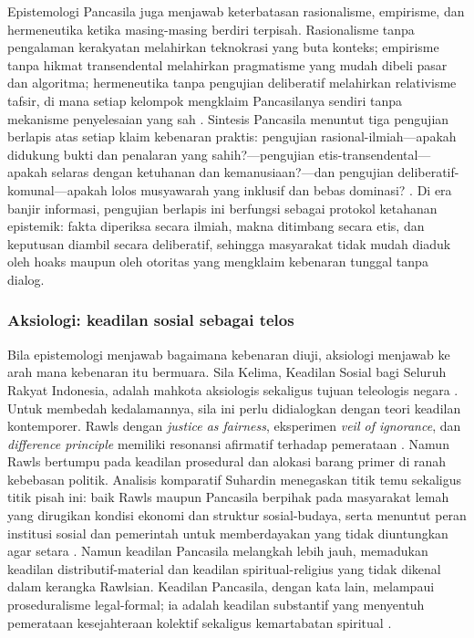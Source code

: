 \documentclass[journal]{IEEEtran}
\begin{document}
Epistemologi Pancasila juga menjawab keterbatasan rasionalisme, empirisme, dan hermeneutika ketika masing-masing berdiri terpisah. Rasionalisme tanpa pengalaman kerakyatan melahirkan teknokrasi yang buta konteks; empirisme tanpa hikmat transendental melahirkan pragmatisme yang mudah dibeli pasar dan algoritma; hermeneutika tanpa pengujian deliberatif melahirkan relativisme tafsir, di mana setiap kelompok mengklaim Pancasilanya sendiri tanpa mekanisme penyelesaian yang sah \cite{gadamer2004,ricoeur1981,pristiwiyanto2021}. Sintesis Pancasila menuntut tiga pengujian berlapis atas setiap klaim kebenaran praktis: pengujian rasional-ilmiah---apakah didukung bukti dan penalaran yang sahih?---pengujian etis-transendental---apakah selaras dengan ketuhanan dan kemanusiaan?---dan pengujian deliberatif-komunal---apakah lolos musyawarah yang inklusif dan bebas dominasi? \cite{madung2016,habermas1996}. Di era banjir informasi, pengujian berlapis ini berfungsi sebagai protokol ketahanan epistemik: fakta diperiksa secara ilmiah, makna ditimbang secara etis, dan keputusan diambil secara deliberatif, sehingga masyarakat tidak mudah diaduk oleh hoaks maupun oleh otoritas yang mengklaim kebenaran tunggal tanpa dialog.

\subsubsection{Aksiologi: keadilan sosial sebagai telos}

Bila epistemologi menjawab bagaimana kebenaran diuji, aksiologi menjawab ke arah mana kebenaran itu bermuara. Sila Kelima, Keadilan Sosial bagi Seluruh Rakyat Indonesia, adalah mahkota aksiologis sekaligus tujuan teleologis negara \cite{latif2018,pristiwiyanto2021}. Untuk membedah kedalamannya, sila ini perlu didialogkan dengan teori keadilan kontemporer. Rawls dengan \textit{justice as fairness}, eksperimen \textit{veil of ignorance}, dan \textit{difference principle} memiliki resonansi afirmatif terhadap pemerataan \cite{rawls1971}. Namun Rawls bertumpu pada keadilan prosedural dan alokasi barang primer di ranah kebebasan politik. Analisis komparatif Suhardin menegaskan titik temu sekaligus titik pisah ini: baik Rawls maupun Pancasila berpihak pada masyarakat lemah yang dirugikan kondisi ekonomi dan struktur sosial-budaya, serta menuntut peran institusi sosial dan pemerintah untuk memberdayakan yang tidak diuntungkan agar setara \cite{suhardin2023,rawls1971}. Namun keadilan Pancasila melangkah lebih jauh, memadukan keadilan distributif-material dan keadilan spiritual-religius yang tidak dikenal dalam kerangka Rawlsian. Keadilan Pancasila, dengan kata lain, melampaui proseduralisme legal-formal; ia adalah keadilan substantif yang menyentuh pemerataan kesejahteraan kolektif sekaligus kemartabatan spiritual \cite{madung2016,madungmere2021}.
\end{document}

